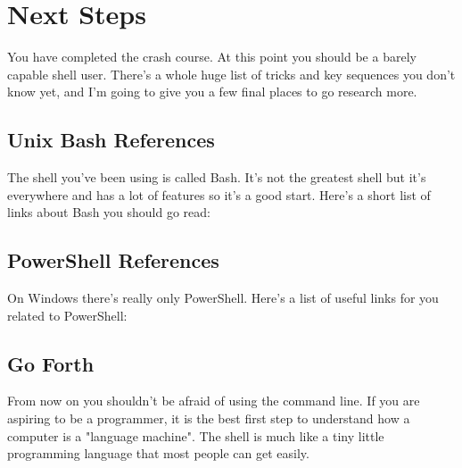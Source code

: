 \chapter{Next Steps}

You have completed the crash course.  At this point you should be a 
barely capable shell user.  There's a whole huge list of tricks and key
sequences you don't know yet, and I'm going to give you a few final
places to go research more.

\section{Unix Bash References}

The shell you've been using is called Bash.  It's not the greatest shell
but it's everywhere and has a lot of features so it's a good start.  Here's a 
short list of links about Bash you should go read:



\section{PowerShell References}

On Windows there's really only PowerShell.  Here's a list of useful links for you
related to PowerShell:


\section{Go Forth}

From now on you shouldn't be afraid of using the command line.  If you are
aspiring to be a programmer, it is the best first step to understand how
a computer is a "language machine".  The shell is much like a tiny little
programming language that most people can get easily.

